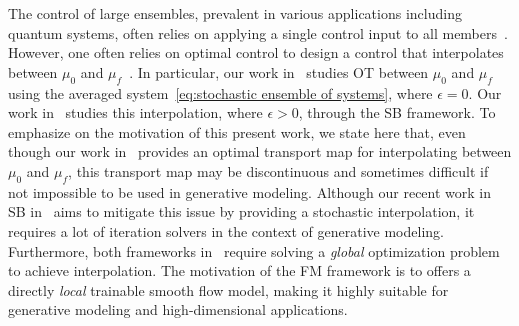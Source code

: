 \documentclass[12pt]{amsart}
\renewcommand{\(}{\left (}
\renewcommand{\)}{\right )}
\numberwithin{equation}{section}
\begin{document}
The control of large ensembles, prevalent in various applications including quantum systems, often relies on applying a single control input to all members~\cite{JSL-NK:06,JSL:06,JSL-NK:05,MHL:86}. However, one often relies on optimal control to design a control that interpolates between $\mu_0$ and $\mu_f$~\cite{ADO:22,DOA-YC:24}. In particular, our work in~\cite{ADO:22} studies OT between $\mu_0$ and $\mu_f$ using the averaged system~\eqref{eq:stochastic ensemble of systems}, where $\epsilon=0$. Our work in~\cite{DOA-YC:24} studies this interpolation, where $\epsilon>0$, through the SB framework.  %
To emphasize on the motivation of this present work, we state here that, even though our work in~\cite{ADO:22} provides an optimal transport map for interpolating between $\mu_0$ and $\mu_f$, this transport map may be discontinuous and sometimes difficult if not impossible to be used in generative modeling. Although our recent work in SB in~\cite{DOA-YC:24} aims to mitigate this issue by providing a stochastic interpolation, it requires a lot of iteration solvers in the context of generative modeling. Furthermore, both frameworks in~\cite{ADO:22,DOA-YC:24} require solving a \emph{global} optimization problem to achieve interpolation. The motivation of the FM framework is to offers a directly \emph{local} trainable smooth flow model, making it highly suitable for generative modeling and high-dimensional applications. %
\end{document}
